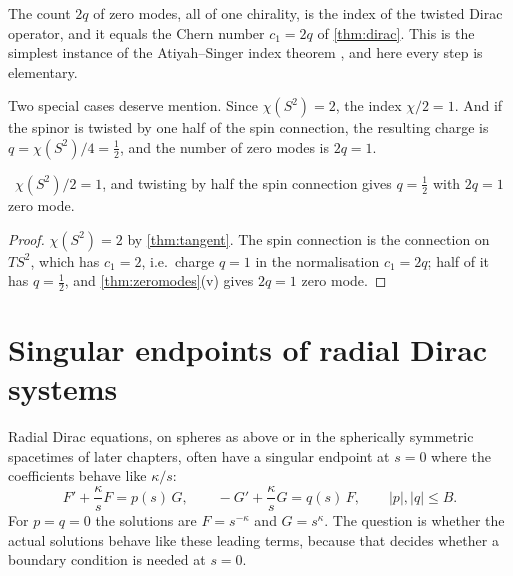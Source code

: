 The count $2q$ of zero modes, all of one chirality, is the index of the twisted Dirac operator, and it equals the Chern number $c_1=2q$ of \cref{thm:dirac}. This is the simplest instance of the Atiyah--Singer index theorem \cite{AtiyahSinger}, and here every step is elementary.

Two special cases deserve mention. Since $\chi(S^2)=2$, the index $\chi/2=1$. And if the spinor is twisted by one half of the spin connection, the resulting charge is $q=\chi(S^2)/4=\frac12$, and the number of zero modes is $2q=1$.

\begin{proposition}\label{prop:onezeromode}\ver\
$\chi(S^2)/2=1$, and twisting by half the spin connection gives $q=\frac12$ with $2q=1$ zero mode.
\end{proposition}
\begin{proof}
$\chi(S^2)=2$ by \cref{thm:tangent}. The spin connection is the connection on $TS^2$, which has $c_1=2$, i.e.\ charge $q=1$ in the normalisation $c_1=2q$; half of it has $q=\frac12$, and \cref{thm:zeromodes}(v) gives $2q=1$ zero mode.
\end{proof}


\section{Singular endpoints of radial Dirac systems}

Radial Dirac equations, on spheres as above or in the spherically symmetric spacetimes of later chapters, often have a singular endpoint at $s=0$ where the coefficients behave like $\kappa/s$:
\begin{equation}\label{eq:radialdirac}
F'+\frac\kappa sF=p(s)\,G,\qquad -G'+\frac\kappa sG=q(s)\,F,\qquad |p|,|q|\le B .
\end{equation}
For $p=q=0$ the solutions are $F=s^{-\kappa}$ and $G=s^{\kappa}$. The question is whether the actual solutions behave like these leading terms, because that decides whether a boundary condition is needed at $s=0$.

